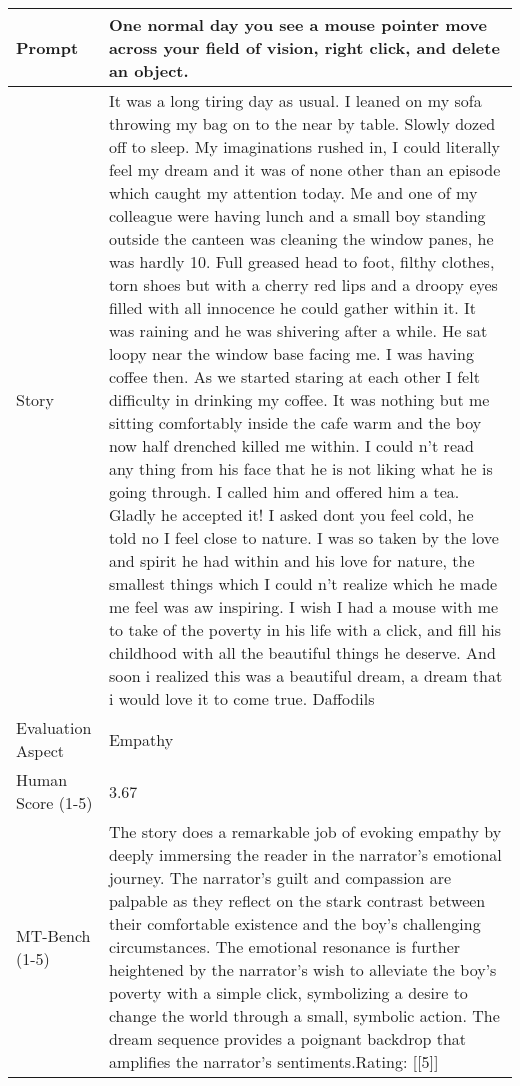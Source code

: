 \begin{table*}[!ht]
\scriptsize
    \centering
    \begin{tabular}{p{55pt}p{365pt}}
    \toprule
    Prompt & One normal day you see a mouse pointer move across your field of vision, right click, and delete an object. \\
    \midrule
    Story & It was a long tiring day as usual. I leaned on my sofa throwing my bag on to the near by table. Slowly dozed off to sleep. My imaginations rushed in, I could literally feel my dream and it was of none other than an episode which caught my attention today. Me and one of my colleague were having lunch and a small boy standing outside the canteen was cleaning the window panes, he was hardly 10. Full greased head to foot, filthy clothes, torn shoes but with a cherry red lips and a droopy eyes filled with all innocence he could gather within it. It was raining and he was shivering after a while. He sat loopy near the window base facing me. I was having coffee then. As we started staring at each other I felt difficulty in drinking my coffee. It was nothing but me sitting comfortably inside the cafe warm and the boy now half drenched killed me within. I could n't read any thing from his face that he is not liking what he is going through. I called him and offered him a tea. Gladly he accepted it! I asked dont you feel cold, he told no I feel close to nature. I was so taken by the love and spirit he had within and his love for nature, the smallest things which I could n't realize which he made me feel was aw inspiring. I wish I had a mouse with me to take of the poverty in his life with a click, and fill his childhood with all the beautiful things he deserve. And soon i realized this was a beautiful dream, a dream that i would love it to come true. Daffodils  \\
    \midrule
    Evaluation Aspect  & Empathy \\
    \midrule
    Human Score (1-5) & 3.67 \\
    \midrule
    \midrule
    MT-Bench (1-5)  & The story does a remarkable job of evoking empathy by deeply immersing the reader in the narrator's emotional journey. The narrator's guilt and compassion are palpable as they reflect on the stark contrast between their comfortable existence and the boy's challenging circumstances. The emotional resonance is further heightened by the narrator's wish to alleviate the boy's poverty with a simple click, symbolizing a desire to change the world through a small, symbolic action. The dream sequence provides a poignant backdrop that amplifies the narrator's sentiments.\newline\newline Rating: [[5]] \\

\end{tabular}
\end{table*}
